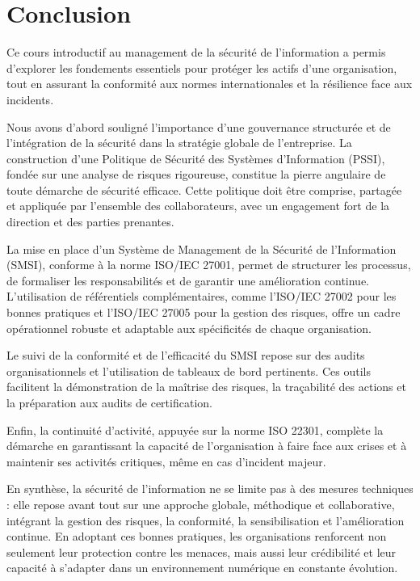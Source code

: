 \section{Conclusion}
Ce cours introductif au management de la sécurité de l’information a permis d’explorer les fondements essentiels pour protéger les actifs d’une organisation, tout en assurant la conformité aux normes internationales et la résilience face aux incidents.

Nous avons d’abord souligné l’importance d’une gouvernance structurée et de l’intégration de la sécurité dans la stratégie globale de l’entreprise. La construction d’une Politique de Sécurité des Systèmes d’Information (PSSI), fondée sur une analyse de risques rigoureuse, constitue la pierre angulaire de toute démarche de sécurité efficace. Cette politique doit être comprise, partagée et appliquée par l’ensemble des collaborateurs, avec un engagement fort de la direction et des parties prenantes.

La mise en place d’un Système de Management de la Sécurité de l’Information (SMSI), conforme à la norme ISO/IEC 27001, permet de structurer les processus, de formaliser les responsabilités et de garantir une amélioration continue. L’utilisation de référentiels complémentaires, comme l’ISO/IEC 27002 pour les bonnes pratiques et l’ISO/IEC 27005 pour la gestion des risques, offre un cadre opérationnel robuste et adaptable aux spécificités de chaque organisation.

Le suivi de la conformité et de l’efficacité du SMSI repose sur des audits organisationnels et l’utilisation de tableaux de bord pertinents. Ces outils facilitent la démonstration de la maîtrise des risques, la traçabilité des actions et la préparation aux audits de certification.

Enfin, la continuité d’activité, appuyée sur la norme ISO 22301, complète la démarche en garantissant la capacité de l’organisation à faire face aux crises et à maintenir ses activités critiques, même en cas d’incident majeur.

En synthèse, la sécurité de l’information ne se limite pas à des mesures techniques : elle repose avant tout sur une approche globale, méthodique et collaborative, intégrant la gestion des risques, la conformité, la sensibilisation et l’amélioration continue. En adoptant ces bonnes pratiques, les organisations renforcent non seulement leur protection contre les menaces, mais aussi leur crédibilité et leur capacité à s’adapter dans un environnement numérique en constante évolution.

